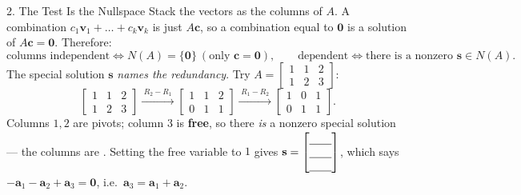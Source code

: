 \documentclass[10pt]{article}
\newcommand{\vv}{\mathbf{v}}
\newcommand{\cc}{\mathbf{c}}
\newcommand{\svec}{\mathbf{s}}
\newcommand{\zero}{\mathbf{0}}
\begin{document}
\begin{notesbox}{2. The Test Is the Nullspace}
Stack the vectors as the columns of $A$. A combination $c_1\vv_1+\dots+c_k\vv_k$ is just $A\cc$, so a
combination equal to $\zero$ is a solution of $A\cc=\zero$. Therefore:
\[
  \text{columns independent} \iff N(A)=\{\zero\} \ (\text{only } \cc=\zero), \qquad
  \text{dependent} \iff \text{there is a nonzero }\svec\in N(A).
\]
The special solution $\svec$ \emph{names the redundancy}. Try $A=\begin{bmatrix} 1 & 1 & 2 \\ 1 & 2 & 3 \end{bmatrix}$:
\[
  \begin{bmatrix} 1 & 1 & 2 \\ 1 & 2 & 3 \end{bmatrix}
  \xrightarrow{\;R_2-R_1\;}
  \begin{bmatrix} 1 & 1 & 2 \\ 0 & 1 & 1 \end{bmatrix}
  \xrightarrow{\;R_1-R_2\;}
  \begin{bmatrix} 1 & 0 & 1 \\ 0 & 1 & 1 \end{bmatrix}.
\]
Columns $1,2$ are pivots; column $3$ is \textbf{free}, so there \emph{is} a nonzero special solution ---
the columns are \blank{2.4cm}. Setting the free variable to $1$ gives
$\svec=\begin{bmatrix}\rule{0pt}{1.0em}\blank{0.7cm}\\ \blank{0.7cm}\\ \blank{0.7cm}\end{bmatrix}$, which
says $-\mathbf{a}_1-\mathbf{a}_2+\mathbf{a}_3=\zero$, i.e.\ $\mathbf{a}_3=\mathbf{a}_1+\mathbf{a}_2$.
\end{notesbox}
\end{document}
